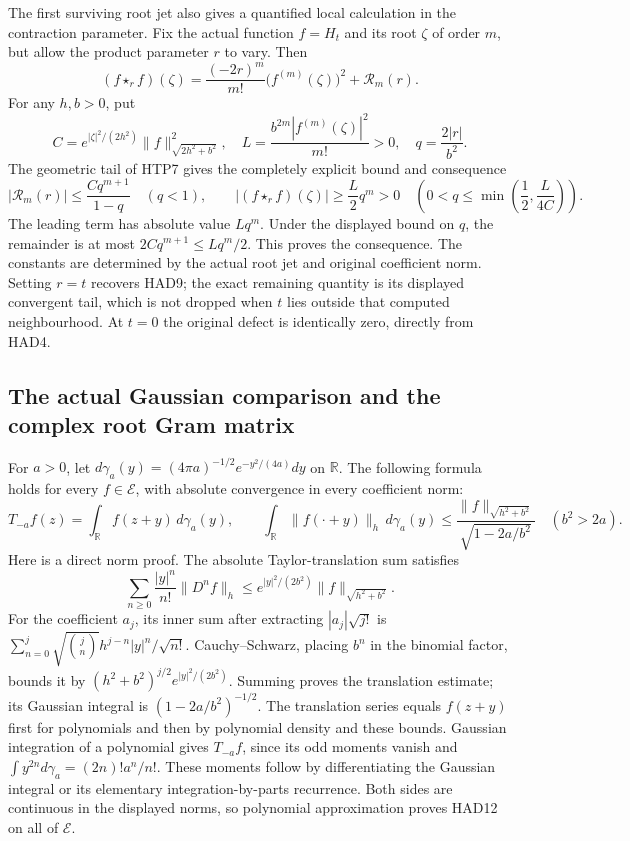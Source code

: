 The first surviving root jet also gives a quantified local
calculation in the contraction parameter. Fix the actual
function $f=H_t$ and its root $\zeta$ of order $m$, but
allow the product parameter $r$ to vary. Then
\begin{equation}\tag{HAD10}
 (f\star_rf)(\zeta)=\frac{(-2r)^m}{m!}
                   \bigl(f^{(m)}(\zeta)\bigr)^2+\mathcal R_m(r).
\end{equation}
For any $h,b>0$, put
\[
 C=e^{|\zeta|^2/(2h^2)}\|f\|_{\sqrt{2h^2+b^2}}^2,
 \quad L=\frac{b^{2m}|f^{(m)}(\zeta)|^2}{m!}>0,
 \quad q=\frac{2|r|}{b^2}.
\]
The geometric tail of HTP7 gives the completely explicit
bound and consequence
\begin{equation}\tag{HAD11}
 |\mathcal R_m(r)|\le\frac{Cq^{m+1}}{1-q}\quad(q<1),\qquad
 |(f\star_rf)(\zeta)|\ge\frac L2q^m>0
 \quad\left(0<q\le\min\left(\frac12,\frac L{4C}\right)\right).
\end{equation}
The leading term has absolute value $Lq^m$. Under the
displayed bound on $q$, the remainder is at most
$2Cq^{m+1}\le Lq^m/2$. This proves the consequence.
The constants are determined by the actual root jet and
original coefficient norm. Setting $r=t$ recovers HAD9;
the exact remaining quantity is its displayed convergent
tail, which is not dropped when $t$ lies outside that
computed neighbourhood. At $t=0$ the original defect is
identically zero, directly from HAD4.

\subsection{The actual Gaussian comparison and the complex root Gram matrix}

For $a>0$, let
$d\gamma_a(y)=(4\pi a)^{-1/2}e^{-y^2/(4a)}dy$ on
$\mathbb R$. The following formula holds for every
$f\in\mathcal E$, with absolute convergence in every
coefficient norm:
\begin{equation}\tag{HAD12}
 T_{-a}f(z)=\int_{\mathbb R}f(z+y)\,d\gamma_a(y),\qquad
 \int_{\mathbb R}\|f(\cdot+y)\|_h\,d\gamma_a(y)
 \le\frac{\|f\|_{\sqrt{h^2+b^2}}}{\sqrt{1-2a/b^2}}
                       \quad(b^2>2a).
\end{equation}
Here is a direct norm proof. The absolute Taylor-translation
sum satisfies
\[
 \sum_{n\ge0}\frac{|y|^n}{n!}\|D^nf\|_h
 \le e^{|y|^2/(2b^2)}\|f\|_{\sqrt{h^2+b^2}}.
\]
For the coefficient $a_j$, its inner sum after extracting
$|a_j|\sqrt{j!}$ is
$\sum_{n=0}^j\sqrt{\binom jn}h^{j-n}|y|^n/\sqrt{n!}$.
Cauchy--Schwarz, placing $b^n$ in the binomial factor,
bounds it by $(h^2+b^2)^{j/2}e^{|y|^2/(2b^2)}$.
Summing proves the translation estimate; its Gaussian
integral is $(1-2a/b^2)^{-1/2}$.
The translation series equals $f(z+y)$ first for
polynomials and then by polynomial density and these
bounds. Gaussian integration of a polynomial gives
$T_{-a}f$, since its odd moments vanish and
$\int y^{2n}d\gamma_a=(2n)!a^n/n!$.
These moments follow by differentiating the Gaussian
integral or its elementary integration-by-parts recurrence.
Both sides are continuous in the displayed norms, so
polynomial approximation proves HAD12 on all of $\mathcal E$.

